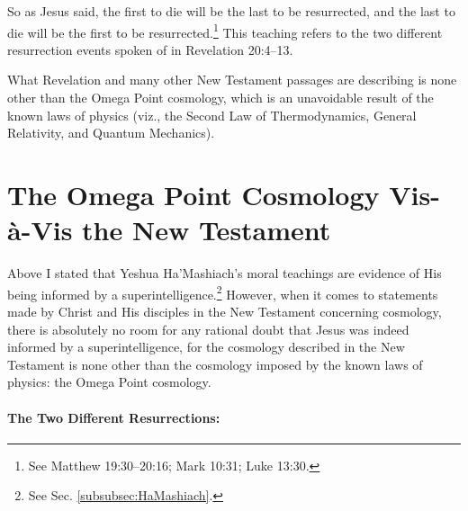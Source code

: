 \documentclass[letterpaper,12pt]{article}
\begin{document}
So as Jesus said, the first to die will be the last to be resurrected, and the last to die will be the first to be resurrected.\footnote{See Matthew 19:30--20:16; Mark 10:31; Luke 13:30.} This teaching refers to the two different resurrection events spoken of in Revelation 20:4--13.

What Revelation and many other New Testament passages are describing is none other than the Omega Point cosmology, which is an unavoidable result of the known laws of physics (viz., the Second Law of Thermodynamics, General Relativity, and Quantum Mechanics).

\section{The Omega Point Cosmology Vis-\`a-Vis the New Testament}
\label{sec:OmegaPointCosmologyVisAVisNewTestament}

Above I stated that Yeshua Ha'Mashiach's moral teachings are evidence of His being informed by a superintelligence.\footnote{See Sec. \ref{subsubsec:HaMashiach}.} However, when it comes to statements made by Christ and His disciples in the New Testament concerning cosmology, there is absolutely no room for any rational doubt that Jesus was indeed informed by a superintelligence, for the cosmology described in the New Testament is none other than the cosmology imposed by the known laws of physics: the Omega Point cosmology.

\paragraph{The Two Different Resurrections:}
\label{parag:TwoDifferentResurrections}
\end{document}
